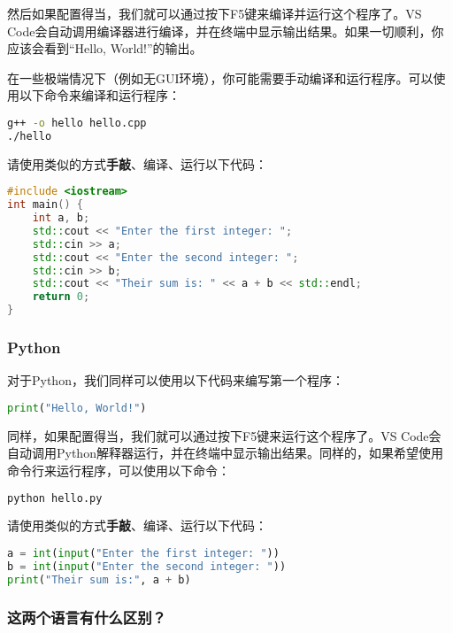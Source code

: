 \documentclass[../main.tex]{subfiles}
\begin{document}
然后如果配置得当，我们就可以通过按下F5键来编译并运行这个程序了。VS Code会自动调用编译器进行编译，并在终端中显示输出结果。如果一切顺利，你应该会看到“Hello, World!”的输出。

在一些极端情况下（例如无GUI环境），你可能需要手动编译和运行程序。可以使用以下命令来编译和运行程序：

\begin{lstlisting}[language=bash]
g++ -o hello hello.cpp
./hello
\end{lstlisting}

请使用类似的方式\textbf{手敲}、编译、运行以下代码：

\begin{lstlisting}[language=C++]
#include <iostream>
int main() {
    int a, b;
    std::cout << "Enter the first integer: ";
    std::cin >> a;
    std::cout << "Enter the second integer: ";
    std::cin >> b;
    std::cout << "Their sum is: " << a + b << std::endl;
    return 0;
}
\end{lstlisting}

\subsubsection{Python}

对于Python，我们同样可以使用以下代码来编写第一个程序：

\begin{lstlisting}[language=Python]
print("Hello, World!")
\end{lstlisting}

同样，如果配置得当，我们就可以通过按下F5键来运行这个程序了。VS Code会自动调用Python解释器运行，并在终端中显示输出结果。同样的，如果希望使用命令行来运行程序，可以使用以下命令：

\begin{lstlisting}[language=bash]
python hello.py
\end{lstlisting}

请使用类似的方式\textbf{手敲}、编译、运行以下代码：

\begin{lstlisting}[language=Python]
a = int(input("Enter the first integer: "))
b = int(input("Enter the second integer: "))
print("Their sum is:", a + b)
\end{lstlisting}

\subsubsection{这两个语言有什么区别？}
\end{document}
